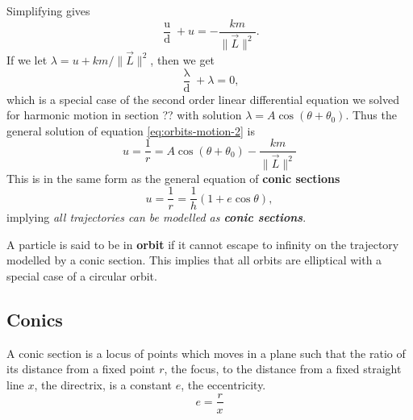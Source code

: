 Simplifying gives
\begin{equation}
    \label{eq:orbits-motion-2}
    \frac{\mathop{\mathrm{d}^2u}}{\mathop{\mathrm{d}\theta^2}} + u = - \frac{km}{\| \vec{L} \|^2}.
\end{equation}
If we let $\lambda = u + km/\| \vec{L} \|^2$, then we get
\begin{equation}
    \frac{\mathop{\mathrm{d}^2\lambda}}{\mathop{\mathrm{d}\theta^2}} + \lambda = 0,
\end{equation}
which is a special case of the second order linear differential equation we solved for harmonic motion in section ?? with solution $\lambda = A \cos (\theta + \theta_0)$. Thus the general solution of equation \ref{eq:orbits-motion-2} is
\begin{equation}
    u  = \frac{1}{r} = A \cos(\theta + \theta_0) - \frac{km}{\| \vec{L} \|^2}
\end{equation}
This is in the same form as the general equation of \textbf{conic sections}
\begin{equation}
    u = \frac{1}{r} = \frac{1}{h} (1 + e \cos \theta),
\end{equation}
implying \textit{all trajectories can be modelled as \textbf{conic sections}}.  

A particle is said to be in \textbf{orbit} if it cannot escape to infinity on the trajectory modelled by a conic section. This implies that all orbits are elliptical with a special case of a circular orbit. 

\subsection{Conics}

A conic section is a locus of points which moves in a plane such that the ratio of its distance from a fixed point $r$, the focus, to the distance from a fixed straight line $x$, the directrix, is a constant $e$, the eccentricity.
\begin{equation}
    e = \frac{r}{x}
\end{equation}

